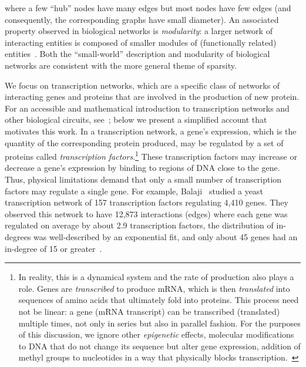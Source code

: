 where a few ``hub'' nodes have many edges but most nodes have few edges
(and consequently, the corresponding graphs have small diameter).
An associated property observed in biological networks is \emph{modularity}:
a larger network of interacting entities is composed of smaller modules of
(functionally related) entities~\cite{Hartwell:1999}.
Both the ``small-world'' description and modularity of biological networks are
consistent with the more general theme of sparsity.

We focus on transcription networks, which are a specific class of networks of
interacting genes and proteins that are involved in the production of new
protein. For an accessible and mathematical introduction to transcription
networks and other biological circuits, see~\cite{Alon:2006}; below we present a
simplified account that motivates this work.
In a transcription network, a gene's expression, which is the quantity of the
corresponding protein produced, may be regulated by a set of proteins called
\emph{transcription factors}.\footnote{In reality, this is a dynamical system
and the rate of production also plays a role.  Genes are \emph{transcribed} to
produce mRNA, which is then \emph{translated} into sequences of amino acids
that ultimately fold into proteins.  This process need not be linear:
a gene (mRNA transcript) can be transcribed (translated) multiple times,
not only in series but also in parallel fashion.  For the purposes of this
discussion, we ignore other \emph{epigenetic} effects, \ie molecular
modifications to DNA that do not change its sequence but alter gene expression,
\eg addition of methyl groups to nucleotides in a way that physically blocks
transcription.~} These transcription factors
may increase or decrease a gene's expression by binding to regions of DNA close
to the gene. Thus, physical limitations demand that only a small number of
transcription factors may regulate a single gene.  For example, Balaji
\etal~studied a yeast transcription network of 157 transcription factors regulating 
4,410 genes. They observed this network to have 12,873 interactions (edges) where
each gene was regulated on average by about 2.9 transcription factors, the
distribution of in-degrees was well-described by an exponential fit, and only
about 45 genes had an in-degree of 15 or greater~\cite{Balaji:2006}.

